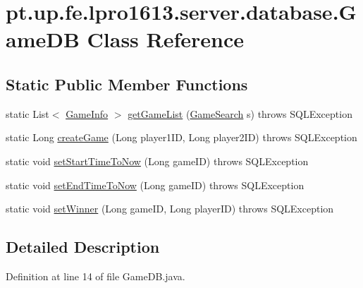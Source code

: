 \hypertarget{classpt_1_1up_1_1fe_1_1lpro1613_1_1server_1_1database_1_1_game_d_b}{}\section{pt.\+up.\+fe.\+lpro1613.\+server.\+database.\+Game\+DB Class Reference}
\label{classpt_1_1up_1_1fe_1_1lpro1613_1_1server_1_1database_1_1_game_d_b}
\subsection*{Static Public Member Functions}
\begin{DoxyCompactItemize}
\item 
static List$<$ \hyperlink{classpt_1_1up_1_1fe_1_1lpro1613_1_1sharedlib_1_1tuples_1_1_game_info}{Game\+Info} $>$ \hyperlink{classpt_1_1up_1_1fe_1_1lpro1613_1_1server_1_1database_1_1_game_d_b_a4c567854868d16ae9b919c0655be65a7}{get\+Game\+List} (\hyperlink{classpt_1_1up_1_1fe_1_1lpro1613_1_1sharedlib_1_1tuples_1_1_game_search}{Game\+Search} s)  throws S\+Q\+L\+Exception 
\item 
static Long \hyperlink{classpt_1_1up_1_1fe_1_1lpro1613_1_1server_1_1database_1_1_game_d_b_af4ec546a91795e5394379cfaaaf073cb}{create\+Game} (Long player1\+ID, Long player2\+ID)  throws S\+Q\+L\+Exception 
\item 
static void \hyperlink{classpt_1_1up_1_1fe_1_1lpro1613_1_1server_1_1database_1_1_game_d_b_a991c06b53598f46f4eea30c8c8fc31f7}{set\+Start\+Time\+To\+Now} (Long game\+ID)  throws S\+Q\+L\+Exception 
\item 
static void \hyperlink{classpt_1_1up_1_1fe_1_1lpro1613_1_1server_1_1database_1_1_game_d_b_ab352e7cd06250b77274f5c4f261f8116}{set\+End\+Time\+To\+Now} (Long game\+ID)  throws S\+Q\+L\+Exception 
\item 
static void \hyperlink{classpt_1_1up_1_1fe_1_1lpro1613_1_1server_1_1database_1_1_game_d_b_a30f4664442da6b7ae80b1821aaa195fa}{set\+Winner} (Long game\+ID, Long player\+ID)  throws S\+Q\+L\+Exception 
\end{DoxyCompactItemize}


\subsection{Detailed Description}


Definition at line 14 of file Game\+D\+B.\+java.



